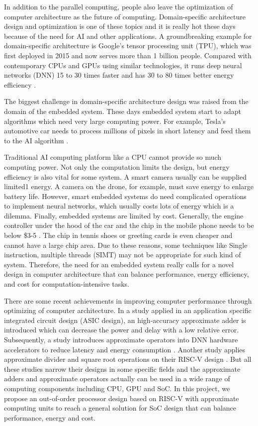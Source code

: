 In addition to the parallel computing, people also leave the optimization of computer architecture as the future of computing. Domain-specific architecture design and optimization is one of these topics and it is really hot these days because of the need for AI and other applications. A groundbreaking example for domain-specific architecture is Google's tensor processing unit (TPU), which was first deployed in 2015 and now serves more than 1 billion people. Compared with contemporary CPUs and GPUs using similar technologies, it runs deep neural networks (DNN) 15 to 30 times faster and has 30 to 80 times better energy efficiency \cite{xxx}.

The biggest challenge in domain-specific architecture design was raised from the domain of the embedded system. These days embedded system start to adapt algorithms which need very large computing power. For example, Tesla's automotive car needs to process millions of pixels in short latency and feed them to the AI algorithm \cite{Tesla}.

Traditional AI computing platform like a CPU cannot provide so much computing power. Not only the computation limits the design, but energy efficiency is also vital for some system. A smart camera usually can be supplied limited1 energy. A camera on the drone, for example, must save energy to enlarge battery life. However, smart embedded systems do need complicated operations to implement neural networks, which usually costs lots of energy which is a dilemma. Finally, embedded systems are limited by cost. Generally, the engine controller under the hood of the car and the chip in the mobile phone needs to be below \$3-5 \cite{nap}. The chip in tennis shoes or greeting cards is even cheaper and cannot have a large chip area. Due to these reasons, some techniques like Single instruction, multiple threads (SIMT) may not be appropriate for such kind of system. Therefore, the need for an embedded system really calls for a novel design in computer architecture that can balance performance, energy efficiency, and cost for computation-intensive tasks.

There are some recent achievements in improving computer performance through optimizing of computer architecture. In a study applied in an application specific integrated circuit design (ASIC design), an high-accuracy approximate adder is introduced which can decrease the power and delay with a low relative error\cite{paper1}. Subsequently, a study introduces approximate operators into DNN hardware accelerators to reduce latency and energy consumption \cite{paper2}. Another study applies approximate divider and square root operations on their RISC-V design \cite{paper3}. But all these studies narrow their designs in some specific fields and the approximate adders and approximate operators actually can be used in a wide range of computing components including CPU, GPU and SoC. In this project, we propose an out-of-order processor design based on RISC-V with approximate computing units to reach a general solution for SoC design that can balance performance, energy and cost.

